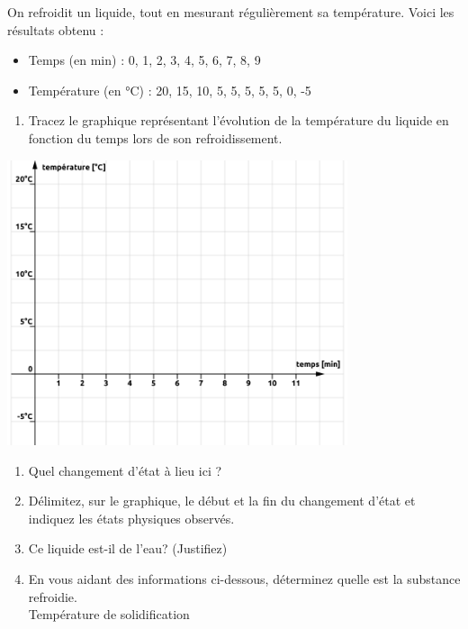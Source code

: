 \documentclass[
  11pt,
  french,
  a4paper,
  openany]{book}
\providecommand{\tightlist}{%
  \setlength{\itemsep}{0pt}\setlength{\parskip}{0pt}}
\begin{document}
\newpage

\begin{Exercise}

On refroidit un liquide, tout en mesurant régulièrement sa température. Voici les résultats obtenu :

\begin{itemize}
\tightlist
\item
  Temps (en min) : 0, 1, 2, 3, 4, 5, 6, 7, 8, 9
\item
  Température (en °C) : 20, 15, 10, 5, 5, 5, 5, 5, 0, -5
\end{itemize}

\begin{enumerate}
\def\labelenumi{\arabic{enumi}.}
\tightlist
\item
  Tracez le graphique représentant l'évolution de la température du liquide en fonction du temps lors de son refroidissement.
\end{enumerate}

\begin{center}
\includegraphics[width=0.75\textwidth,height=\textheight]{images/graph-cyclohexane.png}

\end{center}

\begin{enumerate}
\def\labelenumi{\arabic{enumi}.}
\setcounter{enumi}{1}
\tightlist
\item
  Quel changement d'état à lieu ici ?\\
\item
  Délimitez, sur le graphique, le début et la fin du changement d'état et indiquez les états physiques observés.
\item
  Ce liquide est-il de l'eau? (Justifiez)
\item
  En vous aidant des informations ci-dessous, déterminez quelle est la substance refroidie.\\
  Température de solidification\\
\end{enumerate}


\end{Exercise}
\end{document}
